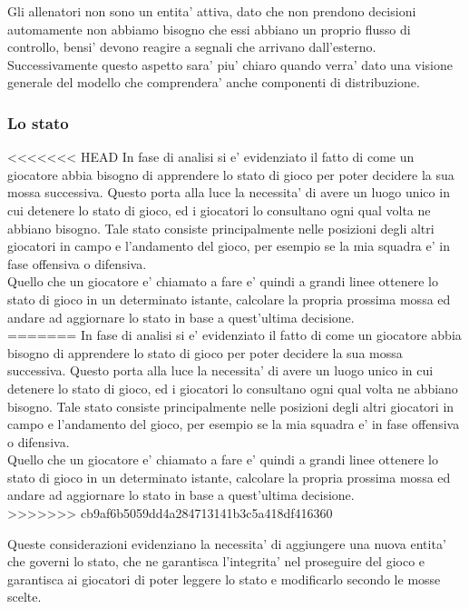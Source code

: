 Gli allenatori non sono un entita' attiva, dato che non prendono decisioni automamente non abbiamo bisogno che essi abbiano un proprio flusso di controllo, bensi' devono reagire a segnali che arrivano dall'esterno. Successivamente questo aspetto sara' piu' chiaro quando verra' dato una visione generale del modello che comprendera' anche componenti di distribuzione.

\subsubsection{Lo stato}
\label{sec:entita_coinvolte_stato}

<<<<<<< HEAD
In fase di analisi si e' evidenziato il fatto di come un giocatore abbia bisogno di apprendere lo stato di gioco per poter decidere la sua mossa successiva. Questo porta alla luce la necessita’ di avere un luogo unico in cui detenere lo stato di gioco, ed i giocatori lo consultano ogni qual volta ne abbiano bisogno. Tale stato consiste principalmente nelle posizioni degli altri giocatori in campo e l’andamento del gioco, per esempio se la mia squadra e’ in fase offensiva o difensiva.\\
Quello che un giocatore e’ chiamato a fare e’ quindi a grandi linee ottenere lo stato di gioco in un determinato istante, calcolare la propria prossima mossa ed andare ad aggiornare lo stato in base a quest’ultima decisione.\\
=======
In fase di analisi si e' evidenziato il fatto di come un giocatore abbia bisogno di apprendere lo stato di gioco per poter decidere la sua mossa successiva. Questo porta alla luce la necessita' di avere un luogo unico in cui detenere lo stato di gioco, ed i giocatori lo consultano ogni qual volta ne abbiano bisogno. Tale stato consiste principalmente nelle posizioni degli altri giocatori in campo e l'andamento del gioco, per esempio se la mia squadra e' in fase offensiva o difensiva.\\

Quello che un giocatore e' chiamato a fare e' quindi a grandi linee ottenere lo stato di gioco in un determinato istante, calcolare la propria prossima mossa ed andare ad aggiornare lo stato in base a quest'ultima decisione.\\
>>>>>>> cb9af6b5059dd4a284713141b3c5a418df416360

Queste considerazioni evidenziano la necessita' di aggiungere una nuova entita' che governi lo stato, che ne garantisca l'integrita' nel proseguire del gioco e garantisca ai giocatori di poter leggere lo stato e modificarlo secondo le mosse scelte.

